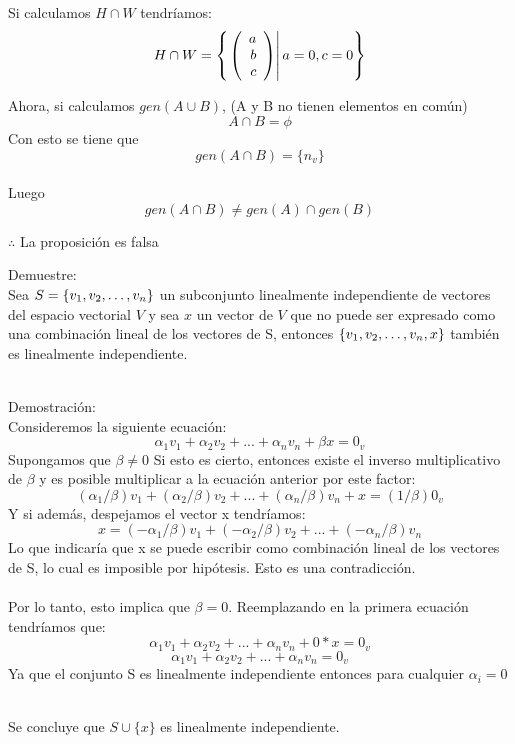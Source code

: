 \begin{enumerate}
Si calculamos $H\cap W$ tendríamos:
~\\
\[H\cap W=\left\{ \left. \left( \begin{array}{r} a\\ b\\ c \end{array} \right) \right| a=0, c=0 \right\}\]

Ahora, si calculamos $gen(A \cup B)$, (A y B no tienen elementos en común)~\\
\[A\cap B=\phi \]
Con esto se tiene que
\[gen(A\cap B)=\lbrace n_v \rbrace\]~\\
Luego
\[gen(A\cap B)\neq gen(A)\cap gen(B)\]

$\therefore$ La proposición es falsa
\newpage


\begin{prob}[]
Demuestre:
\\Sea $S= \lbrace v_1, v_2, \ldots, v_n \rbrace$ un subconjunto linealmente independiente de vectores del espacio vectorial $V$ y sea $x$ un vector de $V$ que no puede ser expresado como una combinaci\'on lineal de los vectores de S, entonces $ \left\{ v_1, v_2, \ldots, v_n, x \right\} $
tambi\'en es linealmente independiente.
\end{prob}
~\\
\sol
Demostración:~\\
Consideremos la siguiente ecuación:
~\\
\[\alpha_1 v_1+\alpha_2 v_2+...+\alpha_n v_n+\beta x=0_v\]
Supongamos que $\beta\neq 0$
Si esto es cierto, entonces existe el inverso multiplicativo de $\beta$ y es posible multiplicar a la ecuación anterior por este factor:~\\
\[(\alpha_1/\beta) v_1+(\alpha_2/\beta) v_2+...+(\alpha_n/\beta) v_n+ x=(1/\beta)0_v\]
Y si además, despejamos el vector x tendríamos:
\[x=(-\alpha_1/\beta) v_1+(-\alpha_2/\beta) v_2+...+(-\alpha_n/\beta) v_n\]
Lo que indicaría que x se puede escribir como combinación lineal de los vectores de S, lo cual es imposible por hipótesis. Esto es una contradicción.
~\\
~\\
Por lo tanto, esto implica que $\beta=0$. Reemplazando en la primera ecuación tendríamos que:
\[\alpha_1 v_1+\alpha_2 v_2+...+\alpha_n v_n+0*x=0_v\]
\[\alpha_1 v_1+\alpha_2 v_2+...+\alpha_n v_n=0_v\]
Ya que el conjunto S es linealmente independiente entonces para cualquier $\alpha_i=0$

~\\
Se concluye que $S\cup \lbrace x\rbrace$ es linealmente independiente.



\newpage

%


\end{enumerate}
